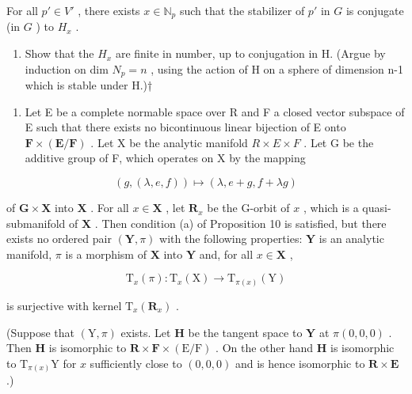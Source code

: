 For all \(p' \in V'\) , there exists \(x \in \mathbb{N}_p\) such that the stabilizer of \(p'\) in \(G\) is conjugate (in \(G\) ) to \(H_x\) .

\begin{enumerate}
\def\labelenumi{(\alph{enumi})}
\setcounter{enumi}{4}
\tightlist
\item
  Show that the \(H_{x}\) are finite in number, up to conjugation in H. (Argue by induction on dim \(N_{p}=n\) , using the action of H on a sphere of dimension n-1 which is stable under H.)†
\end{enumerate}

\begin{enumerate}
\def\labelenumi{\arabic{enumi}.}
\setcounter{enumi}{6}
\tightlist
\item
  Let E be a complete normable space over R and F a closed vector subspace of E such that there exists no bicontinuous linear bijection of E onto \(\mathbf{F} \times (\mathbf{E}/\mathbf{F})\) . Let X be the analytic manifold \(R \times E \times F\) . Let G be the additive group of F, which operates on X by the mapping
\end{enumerate}

\[
(g, (\lambda , e, f)) \mapsto (\lambda , e + g, f + \lambda g)
\]

of \(\mathbf{G} \times \mathbf{X}\) into \(\mathbf{X}\) . For all \(x \in \mathbf{X}\) , let \(\mathbf{R}_x\) be the G-orbit of \(x\) , which is a quasi-submanifold of \(\mathbf{X}\) . Then condition (a) of Proposition 10 is satisfied, but there exists no ordered pair \((\mathbf{Y}, \pi)\) with the following properties: \(\mathbf{Y}\) is an analytic manifold, \(\pi\) is a morphism of \(\mathbf{X}\) into \(\mathbf{Y}\) and, for all \(x \in \mathbf{X}\) ,

\[
\mathrm{T} _ {x} (\pi): \mathrm{T} _ {x} (\mathrm{X}) \rightarrow \mathrm{T} _ {\pi (x)} (\mathrm{Y})
\]

is surjective with kernel \(\mathrm{T}_x(\mathbf{R}_x)\) .

(Suppose that \((\mathrm{Y},\pi)\) exists. Let \(\mathbf{H}\) be the tangent space to \(\mathbf{Y}\) at \(\pi (0,0,0)\) . Then \(\mathbf{H}\) is isomorphic to \(\mathbf{R}\times \mathbf{F}\times (\mathrm{E} / \mathrm{F})\) . On the other hand \(\mathbf{H}\) is isomorphic to \(\mathrm{T}_{\pi (x)}\mathrm{Y}\) for \(x\) sufficiently close to \((0,0,0)\) and is hence isomorphic to \(\mathbf{R}\times \mathbf{E}\) .)


